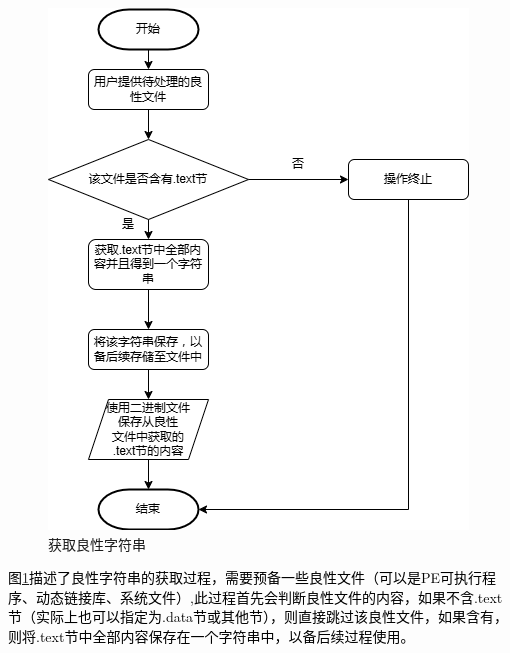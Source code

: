 \begin{figure}[htbp]
  \centering
  \includegraphics[]{images/get_benign_strings.png}
  \caption{获取良性字符串}\label{fig:get_benign_strings}
\end{figure}
\textcolor{black}{图\ref{fig:get_benign_strings}描述了良性字符串的获取过程，需要预备一些良性文件（可以是PE可执行程序、动态链接库、系统文件）,此过程首先会判断良性文件的内容，如果不含.text节（实际上也可以指定为.data节或其他节），则直接跳过该良性文件，如果含有，则将.text节中全部内容保存在一个字符串中，以备后续过程使用。}

